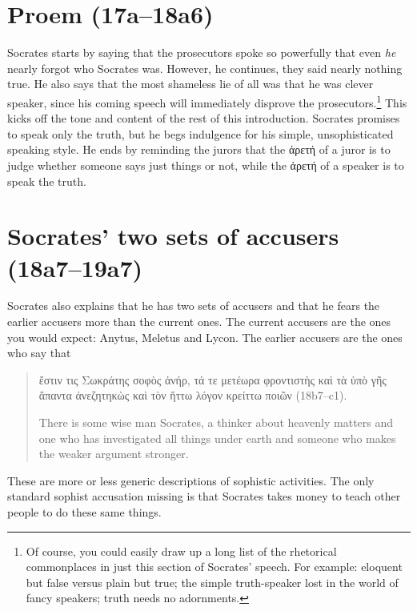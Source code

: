 \documentclass[11pt]{article}
\begin{document}

\section{Proem (17a--18a6)}

Socrates starts by saying that the prosecutors spoke so powerfully that
even \emph{he} nearly forgot who Socrates was.  However, he continues, they
said nearly nothing true.   He also says that the most shameless lie of all
was that he was clever speaker, since his coming speech will immediately
disprove the prosecutors.\footnote{Of course, you could easily draw up
a long list of the rhetorical commonplaces in just this section of Socrates'
speech.  For example: eloquent but false versus plain but true; the simple
truth-speaker lost in the world of fancy speakers; truth needs no
adornments.}  This kicks off the tone and content of the rest of this
introduction.  Socrates promises to speak only the truth, but he begs
indulgence for his simple, unsophisticated speaking style.  He ends by
reminding the jurors that the ἀρετή of a juror is to judge whether someone
says just things or not, while the ἀρετή of a speaker is to speak the
truth.

\section{Socrates' two sets of accusers (18a7--19a7)}

Socrates also explains that he has two sets of accusers and that he fears
the earlier accusers more than the current ones.  The current accusers are
the ones you would expect: Anytus, Meletus and Lycon.  The earlier accusers
are the ones who say that

\begin{quote}
    ἔστιν τις Σωκράτης σοφὸς ἀνήρ, τά τε μετέωρα φροντιστὴς καὶ τὰ ὑπὸ γῆς
    ἅπαντα ἀνεζητηκὼς καὶ τὸν ἥττω λόγον κρείττω ποιῶν (18b7--c1).

    There is some wise man Socrates, a thinker about heavenly matters and
    one who has investigated all things under earth and someone who makes
    the weaker argument stronger.
\end{quote}

These are more or less generic descriptions of sophistic activities.  The
only standard sophist accusation missing is that Socrates takes money to
teach other people to do these same things.
\end{document}
